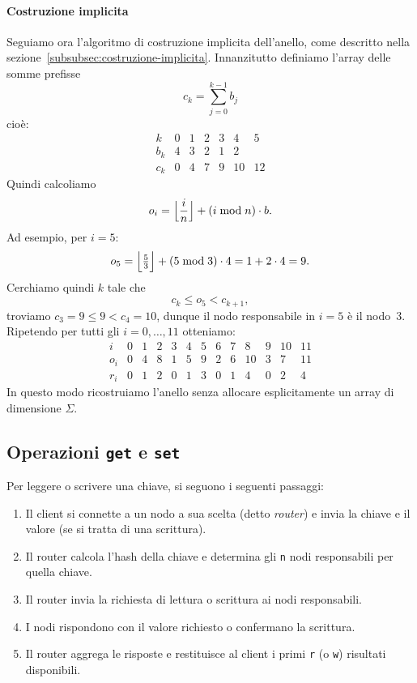 \paragraph{Costruzione implicita}
Seguiamo ora l'algoritmo di costruzione implicita dell'anello, come descritto nella sezione~\ref{subsubsec:costruzione-implicita}.
Innanzitutto definiamo l'array delle somme prefisse
\[
    c_k = \sum_{j=0}^{k-1} b_j
\]
cioè:
\[
    \begin{array}{c|cccccc}
        k   & 0 & 1 & 2 & 3 & 4 & 5\\\hline
        b_k & 4 & 3 & 2 & 1 & 2 & \\\hline
        c_k & 0 & 4 & 7 & 9 & 10 & 12
    \end{array}
\]
Quindi calcoliamo
\[
    o_i = \Bigl\lfloor \frac{i}{n} \Bigr\rfloor + (i \bmod n) \cdot b.
\]
Ad esempio, per \(i = 5\):
\[
    o_5 = \Bigl\lfloor \tfrac{5}{3} \Bigr\rfloor + (5 \bmod 3) \cdot 4 = 1 + 2\cdot4 = 9.
\]
Cerchiamo quindi \(k\) tale che
\[
    c_k \le o_5 < c_{k+1},
\]
troviamo \(c_3 = 9 \le 9 < c_4 = 10\), dunque il nodo responsabile in \(i=5\) è il nodo~3.
Ripetendo per tutti gli \(i=0,\dots,11\) otteniamo:
\[
    \begin{array}{c|cccccccccccc}
        i   & 0 & 1 & 2 & 3 & 4 & 5 & 6 & 7 & 8 & 9 & 10 & 11\\\hline
        o_i & 0 & 4 & 8 & 1 & 5 & 9 & 2 & 6 & 10 & 3 & 7 & 11\\\hline
        r_i & 0 & 1 & 2 & 0 & 1 & 3 & 0 & 1 & 4 & 0 & 2 & 4
    \end{array}
\]
In questo modo ricostruiamo l'anello senza allocare esplicitamente un array di dimensione \(\Sigma\).

\subsection{Operazioni \texttt{get} e \texttt{set}}
\label{subsec:get-set}

Per leggere o scrivere una chiave, si seguono i seguenti passaggi:
\begin{enumerate}
    \item Il client si connette a un nodo a sua scelta (detto \emph{router}) e invia la chiave e il valore (se si tratta di una scrittura).
    \item Il router calcola l'hash della chiave e determina gli \texttt{n} nodi responsabili per quella chiave.
    \item Il router invia la richiesta di lettura o scrittura ai nodi responsabili.
    \item I nodi rispondono con il valore richiesto o confermano la scrittura.
    \item Il router aggrega le risposte e restituisce al client i primi \texttt{r} (o \texttt{w}) risultati disponibili.
\end{enumerate}

